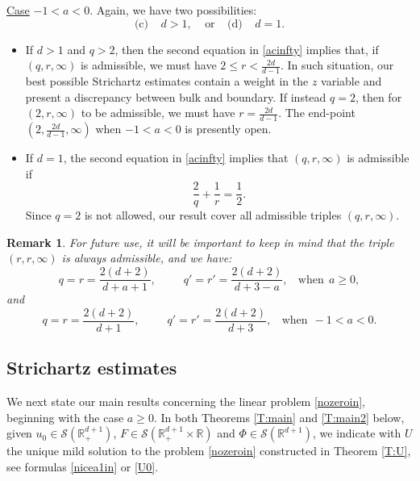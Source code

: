 \documentclass[11pt,letter]{amsart}
\def \RN {\mathbb{R}_+^{d+1}}
\def \R {\mathbb{R}}
\numberwithin{equation}{section}
\newtheorem{remark}[theorem]{Remark}
\numberwithin{equation}{section}
\begin{document}
\vskip 0.2in

\noindent \underline{Case} $-1<a<0$. Again, we have two possibilities:
 \begin{equation}\label{a20}
\text{(c)}\ \ \ \ \ d>1,\ \ \ \ \ \text{or}\ \ \ \ \ \text{(d)}\ \ \ \ \ d=1.
\end{equation}
\begin{itemize}
\item[(c)] If $d>1$ and $q>2$, then the second equation in \eqref{acinfty} implies that, if $(q,r,\infty)$ is admissible, we must have $2\le r < \frac{2d}{d-1}$. In such situation, our best possible Strichartz estimates contain a weight in the $z$ variable and present a discrepancy between bulk and boundary.
If instead $q=2$, then for $(2,r,\infty)$ to be admissible, we must have $r = \frac{2d}{d-1}$. The end-point $(2,\frac{2d}{d-1},\infty)$ when $-1<a<0$ is presently open. 
\item[(d)] If $d =1$, the second equation in \eqref{acinfty} implies that $(q,r,\infty)$ is admissible if
\[
\frac 2q + \frac 1r = \frac 12.
\] 
Since $q = 2$ is not allowed, our result cover all admissible triples $(q,r,\infty)$.
\end{itemize}

\begin{remark}\label{R:rr}
For future use, it will be important to keep in mind that the triple $(r,r,\infty)$ is always admissible, and we have: 
\begin{equation}\label{same}
q = r = \frac{2(d+2)}{d+a+1},\ \ \ \ \ \ \ \ \ \ \ q' = r' = \frac{2(d+2)}{d+3-a},\ \ \ \ \text{when}\ \ a\ge 0,
\end{equation}
and
\begin{equation}\label{same0}
q = r = \frac{2(d+2)}{d+1},\ \ \ \ \ \ \ \ \ \ \ q' = r' = \frac{2(d+2)}{d+3},\ \ \ \ \text{when}\ \ -1<a< 0.
\end{equation}
\end{remark}





\vskip 0.2in


\subsection{Strichartz estimates} We next  state our main results concerning the linear problem \eqref{nozeroin}, beginning with the case $a\ge 0$. In both Theorems \ref{T:main} and \ref{T:main2} below, given $u_0\in \mathscr S(\RN)$, $F \in \mathscr S(\RN\times \R)$ and $\Phi\in \mathscr S(\R^{d+1})$, we indicate with $U$ the unique mild solution to the problem \eqref{nozeroin} constructed in Theorem \ref{T:U}, see formulas \eqref{nicea1in} or \eqref{U0}.
\end{document}
